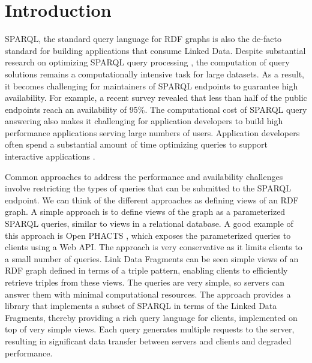 \section{Introduction}
SPARQL, the standard query language for RDF graphs is also the de-facto standard for building applications that consume Linked Data. 
Despite substantial research on optimizing SPARQL query processing \cite{Pham2013}, the computation of query solutions remains a computationally intensive task for large datasets.
As a result, it becomes challenging for maintainers of SPARQL endpoints to guarantee high availability.
For example, a recent survey \cite{buil2013sparql} revealed that less than half of the public endpoints reach an availability of 95\%.
The computational cost of SPARQL query answering also makes it challenging for application developers to build high performance applications serving large numbers of users.
Application developers often spend a substantial amount of time optimizing queries to support interactive applications \cite{Loizou_Angles_Groth_2014}.

Common approaches to address the performance and availability challenges involve restricting the types of queries that can be submitted to the SPARQL endpoint.
We can think of the different approaches as defining views of an RDF graph.
A simple approach is to define views of the graph as a parameterized SPARQL queries, similar to views in a relational database.
A good example of this approach is Open PHACTS \cite{Groth_Loizou_Gray_Goble_Harland_Pettifer_2014}, which exposes the parameterized queries to clients using a Web API.
The approach is very conservative as it limits clients to a small number of queries.
%
Link Data Fragments \cite{Verborgh2014} can be seen simple views of an RDF graph defined in terms of a triple pattern, enabling clients to efficiently retrieve triples from these views.
The queries are very simple, so servers can answer them with minimal computational resources.
The approach provides a library that implements a subset of SPARQL in terms of the Linked Data Fragments, thereby providing a rich query language for clients, implemented on top of very simple views.
Each query generates multiple requests to the server, resulting in significant data transfer between servers and clients and degraded performance. 